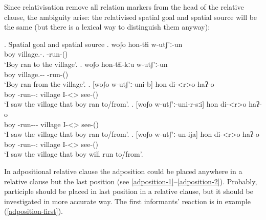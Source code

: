 Since relativisation remove all relation markers from the head of the relative clause, the ambiguity arise: the relativised spatial goal and spatial source will be the same (but there is a lexical way to distinguish them anyway):

\ex. Spatial goal and spatial source
	\ag. woʃo hon-tɬi w-utʃ'ː-un\\
			boy {village.\Obl-\Inter.\Lat} {\M-run-\Pst(\Aor)}\\
			\glt `Boy ran to the village'.
	\bg. woʃo hon-tɬi-kːu w-utʃ'ː-un\\
			boy {village.\Obl-\Inter-\Elat} {\M-run-\Pst(\Aor)}\\
			\glt `Boy ran from the village'.
	\bg. [woʃo w-utʃ'ː-uni-b] hon di-<r>o haʔ-o\\
			boy {\M-run-\Pst-\Ptcp:\Pst} village {I-<\Nans>\Aff} {see-\Pst(\Aor)}\\
			\glt `I saw the village that boy ran to/from'.
	\bg. [woʃo w-utʃ'ː-uni-r-sːi] hon di-<r>o haʔ-o\\
			boy {\M-run-\Pst-\Prog-\Attr} village {I-<\Nans>\Aff} {see-\Pst(\Aor)}\\
			\glt `I saw the village that boy ran to/from'.			
	\bg. [woʃo w-utʃ'ː-un-ija] hon di-<r>o haʔ-o\\
			boy {\M-run-\Npst-\Ptcp:\Fut} village {I-<\Nans>\Aff} {see-\Pst(\Aor)}\\
			\glt `I saw the village that boy will run to/from'.

In adpositional relative clause the adposition could be placed anywhere in a relative clause but the last position (see \ref{adposition-1}--\ref{adposition-2}). Probably, participle should be placed in last position in a relative clause, but it should be investigated in more accurate way. The first informants' reaction is in example (\ref{adposition-first}).

